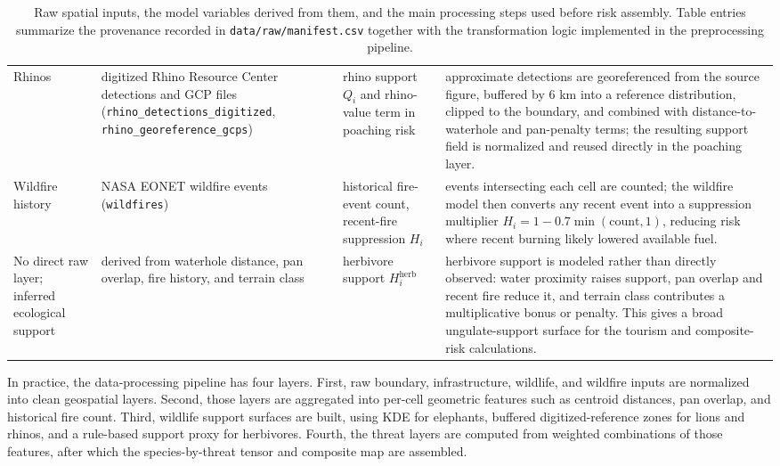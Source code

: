 \begin{table}[H]
\begin{tabular}{p{} p{} p{} p{}}
Rhinos & digitized Rhino Resource Center detections \cite{rrc_rhino} and GCP files (\texttt{rhino\_detections\_digitized}, \texttt{rhino\_georeference\_gcps}) & rhino support $Q_i$ and rhino-value term in poaching risk & approximate detections are georeferenced from the source figure, buffered by 6 km into a reference distribution, clipped to the boundary, and combined with distance-to-waterhole and pan-penalty terms; the resulting support field is normalized and reused directly in the poaching layer. \\

Wildfire history & NASA EONET wildfire events \cite{nasa_eonet} (\texttt{wildfires}) & historical fire-event count, recent-fire suppression $H_i$ & events intersecting each cell are counted; the wildfire model then converts any recent event into a suppression multiplier $H_i = 1 - 0.7\min(\text{count},1)$, reducing risk where recent burning likely lowered available fuel. \\

No direct raw layer; inferred ecological support & derived from waterhole distance, pan overlap, fire history, and terrain class & herbivore support $H_i^{\mathrm{herb}}$ & herbivore support is modeled rather than directly observed: water proximity raises support, pan overlap and recent fire reduce it, and terrain class contributes a multiplicative bonus or penalty. This gives a broad ungulate-support surface for the tourism and composite-risk calculations. \\
\hline
\end{tabular}
\caption{Raw spatial inputs, the model variables derived from them, and the main processing steps used before risk assembly. Table entries summarize the provenance recorded in \texttt{data/raw/manifest.csv} together with the transformation logic implemented in the preprocessing pipeline.}
\label{tab:risk_data_processing}
\end{table}

In practice, the data-processing pipeline has four layers. First, raw boundary, infrastructure, wildlife, and wildfire inputs are normalized into clean geospatial layers. Second, those layers are aggregated into per-cell geometric features such as centroid distances, pan overlap, and historical fire count. Third, wildlife support surfaces are built, using KDE for elephants, buffered digitized-reference zones for lions and rhinos, and a rule-based support proxy for herbivores. Fourth, the threat layers are computed from weighted combinations of those features, after which the species-by-threat tensor and composite map are assembled.



